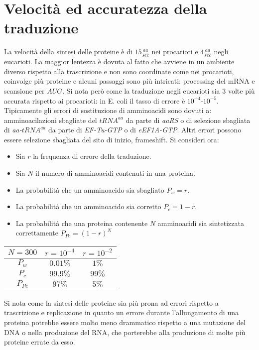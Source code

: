 \section{Velocit\`a ed accuratezza della traduzione}
La velocit\`a della sintesi delle proteine \`e di $15\frac{aa}{sec}$ nei procarioti e $4\frac{aa}{sec}$ negli eucarioti. La maggior lentezza \`e dovuta al fatto che avviene in
un ambiente diverso rispetto alla trascrizione e non sono coordinate come nei procarioti, coinvolge pi\`u proteine e alcuni passaggi sono pi\`u intricati: processing del mRNA e 
scansione per $AUG$. Si nota per\`o come la traduzione negli eucarioti sia $3$ volte pi\`u accurata rispetto ai procarioti: in E. coli il tasso di errore \`e $10^{-4}$-$10^{-5}$. 
Tipicamente gli errori di sostituzione di amminoacidi sono dovuti a: amminoacilazioni sbagliate del \emph{$tRNA^{aa}$} da parte di \emph{aaRS} o di selezione sbagliata 
di \emph{aa-$tRNA^{aa}$} da parte di \emph{EF-Tu-GTP} o di \emph{eEF1A-GTP}. Altri errori possono essere selezione sbagliata del sito di inizio, frameshift. 
Si consideri ora: 
\begin{itemize}
	\item Sia $r$ la frequenza di errore della traduzione.
	\item Sia $N$ il numero di amminoacidi contenuti in una proteina.
	\item La probabilit\`a che un amminoacido sia sbagliato $P_w=r$.
	\item La probabilit\`a che un amminoacido sia corretto $P_c=1-r$.
	\item La probabilit\`a che una proteina contenente $N$ amminoacidi sia sintetizzata correttamente $P_{Pc} = (1-r)^N$
\end{itemize}
\begin{center}
	\begin{tabular}{|c|c|c|}
		\hline
		$N=300$  & $r=10^{-4}$ & $r=10^{-2}$\\
		\hline
		$P_w$	 & $0.01\%$ & $1\%$\\
		\hline
		$P_c$    & $99.9\%$ & $99\%$\\
		\hline
		$P_{Pc}$ & $97\%$ & $5\%$\\
		\hline
	\end{tabular}
\end{center}
Si nota come la sintesi delle proteine sia pi\`u prona ad errori rispetto a trascrizione e replicazione in quanto un errore durante l'allungamento di una proteina potrebbe essere molto
meno drammatico rispetto a una mutazione del DNA o nella produzione del RNA, che porterebbe alla produzione di molte pi\`u proteine errate da esso. 
